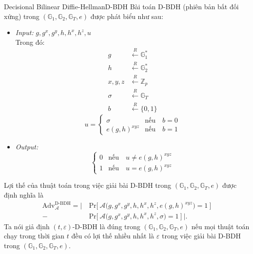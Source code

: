 \documentclass[class=report, crop=false]{standalone}
\begin{document}
		\begin{problem}{Decisional Bilinear Diffie-Hellman}{D-BDH}
			Bài toán D-BDH (phiên bản bất đối xứng) trong $(\mathbb{G}_1, \mathbb{G}_2, \mathbb{G}_T, e)$ được phát biểu như sau:
			\vspace{-\baselineskip}
			\begin{itemize}[leftmargin=1.5cm, itemindent=-0.5cm]
				\item[] \textit{Input:} $g, g^x, g^y, h, h^x, h^z, u$ \\
				Trong đó: \vspace{-\baselineskip}
				\begin{align*}
					g 			&\xleftarrow{R} \mathbb{G}_1^* 	\\
					h 			&\xleftarrow{R} \mathbb{G}_2^* 	\\
					x, y, z 	&\xleftarrow{R} \mathbb{Z}_p 	\\
					\sigma 		&\xleftarrow{R} \mathbb{G}_T 	\\
					b 			&\xleftarrow{R} \{ 0, 1 \}
				\end{align*}
				\[
					u = \begin{cases}
						\sigma 			&\text{nếu}\quad b = 0 \\
						e(g, h)^{xyz} 	&\text{nếu}\quad b = 1
					\end{cases}
				\]
				\item[] \textit{Output:}
				\[
					\begin{cases}
						0 &\text{nếu}\quad u \neq e(g, h)^{xyz} \\
						1 &\text{nếu}\quad u = e(g, h)^{xyz}
					\end{cases}
				\]
			\end{itemize}
			\vspace{-\baselineskip}\par
			Lợi thế của thuật toán \algo trong việc giải bài D-BDH trong $(\mathbb{G}_1, \mathbb{G}_2, \mathbb{G}_T, e)$ được định nghĩa là
			\begin{equation*}
				\begin{split}
					\text{Adv}_{\mathcal{A}}^{\text{D-BDH}} = \Bigg|\ &\text{Pr}\bigg[ \ \mathcal{A}\Big(g, g^x, g^y, h, h^x, h^z, e(g, h)^{xyz} \Big) = 1 \ \bigg] \\
					- &\text{Pr}\bigg[ \ \mathcal{A}\Big(g, g^x, g^y, h, h^x, h^z, \sigma \Big) = 1 \ \bigg]\ \Bigg|.
				\end{split}
			\end{equation*} \indent
			Ta nói giả định $(t, \varepsilon)$-D-BDH là đúng trong $(\mathbb{G}_1, \mathbb{G}_2, \mathbb{G}_T, e)$ nếu mọi thuật toán chạy trong thời gian $t$ đều có lợi thế nhiều nhất là $\varepsilon$ trong việc giải bài D-BDH trong $(\mathbb{G}_1, \mathbb{G}_2, \mathbb{G}_T, e)$.
		\end{problem}
\end{document}
